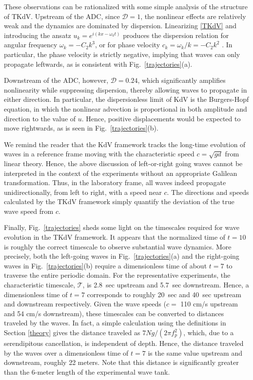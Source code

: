 \documentclass[11pt]{article}
\newcommand{\freqp}{f_p}
\newcommand{\depth}{d}
\newcommand{\lamfac}{N}
\newcommand{\drat}{\mathcal{D}}
\newcommand{\timescale}{\mathcal{T}}
\begin{document}
These observations can be rationalized with some simple analysis of the structure of TKdV. Upstream of the ADC, since $\drat = 1$, the nonlinear effects are relatively weak and the dynamics are dominated by dispersion. Linearizing \eqref{TKdV} and introducing the ansatz $u_k = e^{i(kx - \omega_k t)}$ produces the dispersion relation for angular frequency $\omega_k = -C_2 k^3$, or for phase velocity $c_k = \omega_k/k = -C_2 k^2$ \cite{majdaqi2019}. In particular, the phase velocity is strictly negative, implying that waves can only propagate leftwards, as is consistent with Fig.~\ref{trajectories}(a).

	Downstream of the ADC, however, $\drat = 0.24$, which significantly amplifies nonlinearity while suppressing dispersion, thereby allowing waves to propagate in either direction. In particular, the dispersionless limit of KdV is the Burgers-Hopf equation, in which the nonlinear advection is proportional in both amplitude and direction to the value of $u$. Hence, positive displacements would be expected to move rightwards, as is seen in Fig.~\ref{trajectories}(b).

	We remind the reader that the KdV framework tracks the long-time evolution of waves in a reference frame moving with the characteristic speed $c = \sqrt{g \depth}$ from linear theory. Hence, the above discussion of left-or-right going waves cannot be interpreted in the context of the experiments without an appropriate Galilean transformation. Thus, in the laboratory frame, all waves indeed propagate unidirectionally, from left to right, with a speed near $c$. The directions and speeds calculated by the TKdV framework simply quantify the deviation of the true wave speed from $c$.
		
	Finally, Fig.~\ref{trajectories} sheds some light on the timescales required for wave evolution in the TKdV framework. It appears that the normalized time of $t=10$ is roughly the correct timescale to observe substantial wave dynamics. More precisely, both the left-going waves in Fig.~\ref{trajectories}(a) and the right-going waves in Fig.~\ref{trajectories}(b) require a dimensionless time of about $t=7$ to traverse the entire periodic domain. For the representative experiments, the characteristic timescale, $\timescale$, is 2.8~sec upstream and 5.7~sec downstream. Hence, a dimensionless time of $t=7$ corresponds to roughly 20~sec and 40~sec upstream and downstream respectively. Given the wave speeds ($c = $ 110 cm/s upstream and 54 cm/s downstream), these timescales can be converted to distances traveled by the waves. In fact, a simple calculation using the definitions in Section \ref{theory} gives the distance traveled as $7 \lamfac g/(2 \pi \freqp^2)$, which, due to a serendipitous cancellation, is independent of depth. Hence, the distance traveled by the waves over a dimensionless time of $t=7$ is the same value upstream and downstream,  roughly 22 meters. Note that this distance is significantly greater than the 6-meter length of the experimental wave tank.
\end{document}
